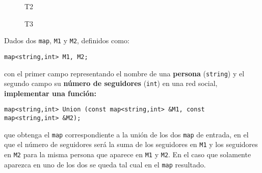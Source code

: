 \documentclass[12pt]{article}
\begin{document}
\begin{ejercicio}[1 punto]
\begin{figure}[H]
    \centering
    \begin{minipage}{0.45\textwidth}
        \centering
        \caption{T2}
    \end{minipage}\hfill
    \begin{minipage}{0.45\textwidth}
        \centering
        \caption{T3}
    \end{minipage}
\end{figure}
    \end{ejercicio}

    \begin{ejercicio}[1 punto]
        Dados dos \verb|map|, \verb|M1| y \verb|M2|, definidos como:
        \begin{verbatim}
map<string,int> M1, M2;
        \end{verbatim}
        con el primer campo representando el nombre de una \textbf{persona} (\verb|string|) y el segundo campo su \textbf{número de seguidores} (\verb|int|) en una red social, \textbf{implementar una función:}
        \begin{verbatim}
map<string,int> Union (const map<string,int> &M1, const map<string,int> &M2);
        \end{verbatim}
        que obtenga el \verb|map| correspondiente a la unión de los dos \verb|map| de entrada, en el que el número de seguidores será la suma de los seguidores en \verb|M1| y los seguidores en \verb|M2| para la misma persona que aparece en \verb|M1| y \verb|M2|. En el caso que solamente aparezca en uno de los dos se queda tal cual en el \verb|map| resultado.
        
    \end{ejercicio}
\end{document}
